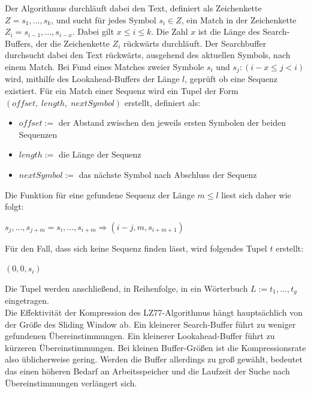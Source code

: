 \documentclass[10pt, a4paper]{article}
\begin{document}
\noindent
Der Algorithmus durchläuft dabei den Text, definiert als Zeichenkette $Z = {s_1,...,s_k}$, und sucht für jedes Symbol $s_i \in Z$, ein Match in der Zeichenkette $Z_i = s_{i-1},...,s_{i-x}$. Dabei gilt $x \leqslant i \leqslant k$. Die Zahl $x$ ist die Länge des Search-Buffers, der die Zeichenkette $Z_i$ rückwärts durchläuft. \newline
Der Searchbuffer durchsucht dabei den Text rückwärts, ausgehend des aktuellen Symbols, nach einem Match. Bei Fund eines Matches zweier Symbole $s_i$ und $s_j:(i-x \leqslant j < i)$ wird, mithilfe des Lookahead-Buffers der Länge $l$, geprüft ob eine Sequenz existiert. \newline Für ein Match einer Sequenz wird ein Tupel der Form $(offset,\; length,\; nextSymbol)$ erstellt, definiert als: 
\begin{itemize}
    \item $offset :=$ der Abstand zwischen den jeweils ersten Symbolen der beiden Sequenzen
    \item $length :=$ die Länge der Sequenz
    \item $nextSymbol :=$ das nächste Symbol nach Abschluss der Sequenz
\end{itemize} 

\noindent
Die Funktion für eine gefundene Sequenz der Länge $m \leqslant l$ liest sich daher wie folgt:
\begin{center}
    $s_j,...,s_{j+m} = s_i,...,s_{i+m} \Rightarrow (i-j,m,s_{i+m+1})$\newline
\end{center}
Für den Fall, dass sich keine Sequenz finden lässt, wird folgendes Tupel $t$ erstellt:
\begin{center}
    $(0,0,s_i)$
\end{center}

\noindent
Die Tupel werden anschließend, in Reihenfolge, in ein Wörterbuch $L:=t_1,...,t_g$ eingetragen. \\

\noindent
Die Effektivität der Kompression des LZ77-Algorithmus hängt hauptsächlich von der Größe des Sliding Window ab. Ein kleinerer Search-Buffer führt zu weniger gefundenen Übereinstimmungen. Ein kleinerer Lookahead-Buffer führt zu kürzeren Übereinstimmungen. Bei kleinen Buffer-Größen ist die Kompressionsrate also üblicherweise gering. Werden die Buffer allerdings zu groß gewählt, bedeutet das einen höheren Bedarf an Arbeitsspeicher und die Laufzeit der Suche nach Übereinstimmungen verlängert sich. \cite{website:uni-duisburg-essen}
\end{document}
